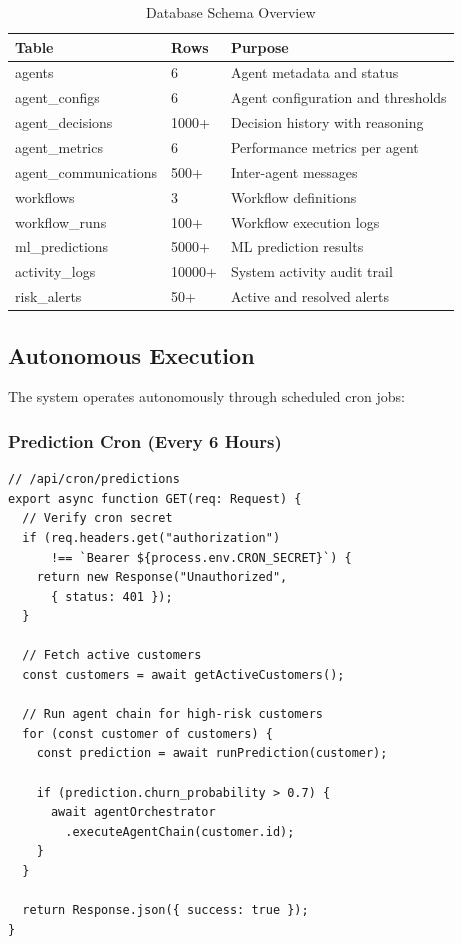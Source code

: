 \documentclass[conference]{IEEEtran}
\begin{document}
\begin{table}[htbp]
\caption{Database Schema Overview}
\begin{center}
\begin{tabular}{|l|l|p{4cm}|}
\hline
\textbf{Table} & \textbf{Rows} & \textbf{Purpose} \\
\hline
agents & 6 & Agent metadata and status \\
agent\_configs & 6 & Agent configuration and thresholds \\
agent\_decisions & 1000+ & Decision history with reasoning \\
agent\_metrics & 6 & Performance metrics per agent \\
agent\_communications & 500+ & Inter-agent messages \\
workflows & 3 & Workflow definitions \\
workflow\_runs & 100+ & Workflow execution logs \\
ml\_predictions & 5000+ & ML prediction results \\
activity\_logs & 10000+ & System activity audit trail \\
risk\_alerts & 50+ & Active and resolved alerts \\
\hline
\end{tabular}
\label{tab:schema}
\end{center}
\end{table}

\subsection{Autonomous Execution}
The system operates autonomously through scheduled cron jobs:

\subsubsection{Prediction Cron (Every 6 Hours)}
\begin{lstlisting}[]
// /api/cron/predictions
export async function GET(req: Request) {
  // Verify cron secret
  if (req.headers.get("authorization") 
      !== `Bearer ${process.env.CRON_SECRET}`) {
    return new Response("Unauthorized", 
      { status: 401 });
  }
  
  // Fetch active customers
  const customers = await getActiveCustomers();
  
  // Run agent chain for high-risk customers
  for (const customer of customers) {
    const prediction = await runPrediction(customer);
    
    if (prediction.churn_probability > 0.7) {
      await agentOrchestrator
        .executeAgentChain(customer.id);
    }
  }
  
  return Response.json({ success: true });
}
\end{lstlisting}
\end{document}
